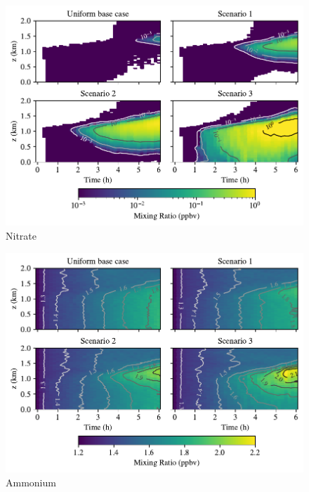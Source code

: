\newpage
\begin{figure}[h]
  \centering
    \includegraphics[width=\textwidth]{figures/chapter5/height-time-pmc_NO3-four-scenarios.pdf}
    \caption{Nitrate}
    \label{fig:ht-no3}
\end{figure}

\newpage
\begin{figure}[h]
  \centering
    \includegraphics[width=\textwidth]{figures/chapter5/height-time-pmc_NH4-four-scenarios.pdf}
    \caption{Ammonium}
    \label{fig:ht-nh4}
\end{figure}


